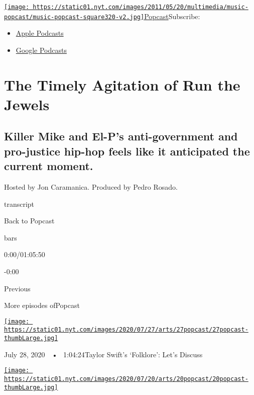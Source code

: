 \href{https://www.nytimes.com/column/popcast-pop-music-podcast}{\texttt{[image: https://static01.nyt.com/images/2011/05/20/multimedia/music-popcast/music-popcast-square320-v2.jpg]}Popcast}Subscribe:

\begin{itemize}
\tightlist
\item
  \href{https://itunes.apple.com/us/podcast/id120315823}{Apple Podcasts}
\item
  \href{https://play.google.com/music/listen?u=0\#/ps/Izaidkcp4ffluag7z7wuzica2su}{Google
  Podcasts}
\end{itemize}

\hypertarget{the-timely-agitation-of-run-the-jewels}{%
\section{The Timely Agitation of Run the
Jewels}\label{the-timely-agitation-of-run-the-jewels}}

\hypertarget{killer-mike-and-el-ps-anti-government-and-pro-justice-hip-hop-feels-like-it-anticipated-the-current-moment}{%
\subsection{Killer Mike and El-P's anti-government and pro-justice
hip-hop feels like it anticipated the current
moment.}\label{killer-mike-and-el-ps-anti-government-and-pro-justice-hip-hop-feels-like-it-anticipated-the-current-moment}}

Hosted by Jon Caramanica. Produced by Pedro Rosado.

transcript

Back to Popcast

bars

0:00/01:05:50

-0:00

Previous

More episodes ofPopcast

\href{https://www.nytimes.com/2020/07/27/arts/music/popcast-taylor-swift-folklore.html?action=click\&module=audio-series-bar\&region=header\&pgtype=Article}{\texttt{[image: https://static01.nyt.com/images/2020/07/27/arts/27popcast/27popcast-thumbLarge.jpg]}}

July 28, 2020~~•~ 1:04:24Taylor Swift's `Folklore': Let's Discuss

\href{https://www.nytimes.com/2020/07/20/arts/music/popcast-ennio-morricone.html?action=click\&module=audio-series-bar\&region=header\&pgtype=Article}{\texttt{[image: https://static01.nyt.com/images/2020/07/20/arts/20popcast/20popcast-thumbLarge.jpg]}}

